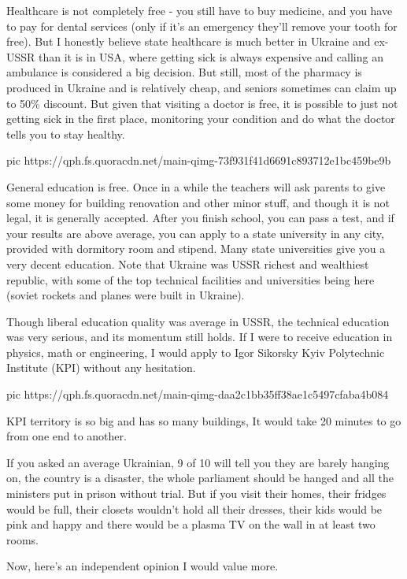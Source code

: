 Healthcare is not completely free - you still have to buy medicine, and you
have to pay for dental services (only if it’s an emergency they’ll remove your
tooth for free). But I honestly believe state healthcare is much better in
Ukraine and ex-USSR than it is in USA, where getting sick is always expensive
and calling an ambulance is considered a big decision. But still, most of the
pharmacy is produced in Ukraine and is relatively cheap, and seniors sometimes
can claim up to 50\% discount. But given that visiting a doctor is free, it is
possible to just not getting sick in the first place, monitoring your condition
and do what the doctor tells you to stay healthy.

\ifcmt
	pic https://qph.fs.quoracdn.net/main-qimg-73f931f41d6691c893712e1bc459be9b
\fi

General education is free. Once in a while the teachers will ask parents to
give some money for building renovation and other minor stuff, and though it is
not legal, it is generally accepted. After you finish school, you can pass a
test, and if your results are above average, you can apply to a state
university in any city, provided with dormitory room and stipend. Many state
universities give you a very decent education. Note that Ukraine was USSR
richest and wealthiest republic, with some of the top technical facilities and
universities being here (soviet rockets and planes were built in Ukraine).

Though liberal education quality was average in USSR, the technical education
was very serious, and its momentum still holds. If I were to receive education
in physics, math or engineering, I would apply to Igor Sikorsky Kyiv
Polytechnic Institute (KPI) without any hesitation.

\ifcmt
	pic https://qph.fs.quoracdn.net/main-qimg-daa2c1bb35ff38ae1c5497cfaba4b084
\fi

KPI territory is so big and has so many buildings, It would take 20 minutes to
go from one end to another.

If you asked an average Ukrainian, 9 of 10 will tell you they are barely
hanging on, the country is a disaster, the whole parliament should be hanged
and all the ministers put in prison without trial. But if you visit their
homes, their fridges would be full, their closets wouldn’t hold all their
dresses, their kids would be pink and happy and there would be a plasma TV on
the wall in at least two rooms.

Now, here’s an independent opinion I would value more.

